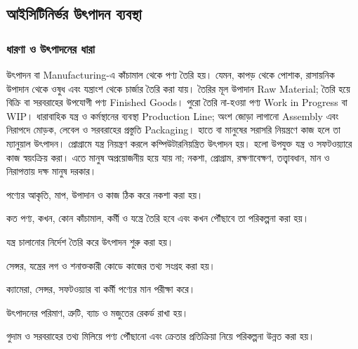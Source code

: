 \subsection{আইসিটিনির্ভর উৎপাদন ব্যবস্থা}
\label{sec:ch1-production}
\subsubsection{ধারণা ও উৎপাদনের ধারা}
উৎপাদন বা Manufacturing-এ কাঁচামাল থেকে পণ্য তৈরি হয়। যেমন, কাপড় থেকে পোশাক, রাসায়নিক উপাদান থেকে ওষুধ এবং যন্ত্রাংশ থেকে চার্জার তৈরি করা যায়। তৈরির মূল উপাদান Raw Material; তৈরি হয়ে বিক্রি বা সরবরাহের উপযোগী পণ্য Finished Goods। পুরো তৈরি না-হওয়া পণ্য Work in Progress বা WIP। ধারাবাহিক যন্ত্র ও কর্মস্থানের ব্যবস্থা Production Line; অংশ জোড়া লাগানো Assembly এবং নিরাপদে মোড়ক, লেবেল ও সরবরাহের প্রস্তুতি Packaging।
হাতে বা মানুষের সরাসরি নিয়ন্ত্রণে কাজ হলে তা ম্যানুয়াল উৎপাদন। প্রোগ্রামে যন্ত্র নিয়ন্ত্রণ করলে কম্পিউটারনিয়ন্ত্রিত উৎপাদন হয়।  হলো উপযুক্ত যন্ত্র ও সফটওয়্যারে কাজ স্বয়ংক্রিয় করা। এতে মানুষ অপ্রয়োজনীয় হয়ে যায় না; নকশা, প্রোগ্রাম, রক্ষণাবেক্ষণ, তত্ত্বাবধান, মান ও নিরাপত্তায় দক্ষ মানুষ দরকার।
\begin{compactenum}
\item পণ্যের আকৃতি, মাপ, উপাদান ও কাজ ঠিক করে নকশা করা হয়।
\item কত পণ্য, কখন, কোন কাঁচামাল, কর্মী ও যন্ত্রে তৈরি হবে এবং কখন পৌঁছাবে তা পরিকল্পনা করা হয়।
\item যন্ত্র চালানোর নির্দেশ তৈরি করে উৎপাদন শুরু করা হয়।
\item সেন্সর, যন্ত্রের লগ ও শনাক্তকারী কোডে কাজের তথ্য সংগ্রহ করা হয়।
\item ক্যামেরা, সেন্সর, সফটওয়্যার বা কর্মী পণ্যের মান পরীক্ষা করে।
\item উৎপাদনের পরিমাণ, ত্রুটি, ব্যাচ ও মজুতের রেকর্ড রাখা হয়।
\item গুদাম ও সরবরাহের তথ্য মিলিয়ে পণ্য পৌঁছানো এবং ক্রেতার প্রতিক্রিয়া নিয়ে পরিকল্পনা উন্নত করা হয়।
\end{compactenum}
